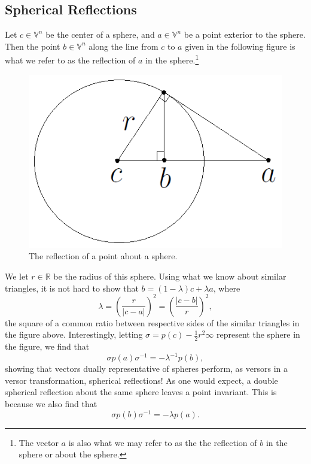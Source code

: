 \documentclass[12pt]{article}
\newcommand{\V}{\mathbb{V}}
\newcommand{\R}{\mathbb{R}}
\newcommand{\nvai}{\infty}
\begin{document}
\subsection{Spherical Reflections}\label{sec_spherical_reflections}

Let $c\in\V^n$ be the center of a sphere, and $a\in\V^n$ be a point
exterior to the sphere.  Then the point $b\in\V^n$ along the line
from $c$ to $a$ given in the following figure is what we refer to
as the reflection of $a$ in the sphere.\footnote{The vector $a$ is
also what we may refer to as the the reflection of $b$ in the sphere or about the sphere.}
\begin{figure}[H]\label{fig_spherical_reflection}
\centering
\includegraphics[scale=0.3]{SphericalReflectionFigure}
\caption{The reflection of a point about a sphere.}
\end{figure}
We let $r\in\R$ be the radius of this sphere.  Using what we know about similar
triangles, it is not hard to show that $b = (1-\lambda)c + \lambda a$,
where
\begin{equation*}
\lambda = \left(\frac{r}{|c-a|}\right)^2 = \left(\frac{|c-b|}{r}\right)^2,
\end{equation*}
the square of a common ratio between respective sides of the
similar triangles in the figure above.
Interestingly, letting $\sigma=p(c)-\frac{1}{2}r^2\nvai$ represent the sphere in the figure, we find that
\begin{equation*}
\sigma p(a)\sigma^{-1} = -\lambda^{-1}p(b),
\end{equation*}
showing that vectors dually
representative of spheres perform, as versors in a versor transformation, spherical reflections!
As one would expect, a double spherical reflection about the same sphere leaves a point
invariant.  This is because we also find that
\begin{equation*}
\sigma p(b)\sigma^{-1} = -\lambda p(a).
\end{equation*}
\end{document}
